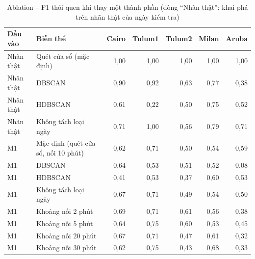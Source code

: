 \begin{table}[htbp]
\centering
\caption{Ablation -- F1 thói quen khi thay một thành phần (dòng ``Nhãn thật'': khai phá trên nhãn thật của ngày kiểm tra)}
\label{tab:ablation}
\small
\begin{tabular}{llrrrrr}
\toprule
Đầu vào & Biến thể & Cairo & Tulum1 & Tulum2 & Milan & Aruba \\
\midrule
Nhãn thật & Quét cửa sổ (mặc định) & 1{,}00 & 1{,}00 & 1{,}00 & 1{,}00 & 1{,}00 \\
Nhãn thật & DBSCAN & 0{,}90 & 0{,}92 & 0{,}63 & 0{,}77 & 0{,}38 \\
Nhãn thật & HDBSCAN & 0{,}61 & 0{,}22 & 0{,}50 & 0{,}75 & 0{,}52 \\
Nhãn thật & Không tách loại ngày & 0{,}71 & 1{,}00 & 0{,}56 & 0{,}79 & 0{,}71 \\
\midrule
M1 & Mặc định (quét cửa sổ, nối 10 phút) & 0{,}62 & 0{,}71 & 0{,}50 & 0{,}54 & 0{,}59 \\
M1 & DBSCAN & 0{,}64 & 0{,}53 & 0{,}51 & 0{,}52 & 0{,}08 \\
M1 & HDBSCAN & 0{,}41 & 0{,}53 & 0{,}37 & 0{,}60 & 0{,}53 \\
M1 & Không tách loại ngày & 0{,}67 & 0{,}71 & 0{,}49 & 0{,}54 & 0{,}50 \\
\midrule
M1 & Khoảng nối 2 phút & 0{,}69 & 0{,}71 & 0{,}61 & 0{,}56 & 0{,}38 \\
M1 & Khoảng nối 5 phút & 0{,}64 & 0{,}75 & 0{,}60 & 0{,}53 & 0{,}45 \\
M1 & Khoảng nối 20 phút & 0{,}67 & 0{,}71 & 0{,}47 & 0{,}61 & 0{,}32 \\
M1 & Khoảng nối 30 phút & 0{,}62 & 0{,}75 & 0{,}43 & 0{,}68 & 0{,}33 \\
\bottomrule
\end{tabular}
\end{table}
